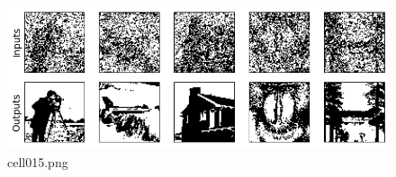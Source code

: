 \begin{figure}[ht]
	\centering
	\includegraphics[scale=0.8, max width=\linewidth]{./fig/energy-based-model/hopfield-model/cell015.png}
	\caption{cell015.png}
	\label{cell015.png}
\end{figure}